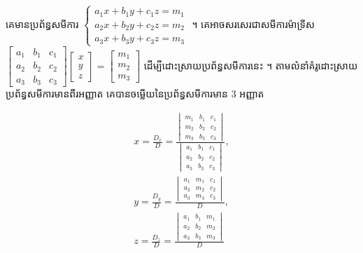 \begin{example}[ឧទាហរណ៍ ២]
គេមានប្រព័ន្ធសមីការ $\begin{cases} a_1x + b_1y + c_1z = m_1\\ a_2x + b_2y + c_2z = m_2\\ a_3x + b_3y + c_3z = m_3 \end{cases}$ ។ គេអាចសរសេរជាសមីការម៉ាទ្រីស $\begin{bmatrix} a_1 & b_1 & c_1\\ a_2 & b_2 & c_2\\ a_3 & b_3 & c_3 \end{bmatrix}\begin{bmatrix} x\\ y\\ z \end{bmatrix} = \begin{bmatrix} m_1\\ m_2\\ m_3 \end{bmatrix}$ ដើម្បីដោះស្រាយប្រព័ន្ធសមីការនេះ ។ តាមលំនាំគំរូដោះស្រាយប្រព័ន្ធសមីការមានពីរអញ្ញាត គេបានចម្លើយនៃប្រព័ន្ធសមីការមាន $3$ អញ្ញាត
\end{example}
\begin{formulaBox}[រូបមន្តក្រាម័រ (៣ អញ្ញាត)]
\[
\begin{gathered}
x = \frac{D_x}{D} = \frac{\begin{vmatrix} m_1 & b_1 & c_1\\ m_2 & b_2 & c_2\\ m_3 & b_3 & c_3 \end{vmatrix}}{\begin{vmatrix} a_1 & b_1 & c_1\\ a_2 & b_2 & c_2\\ a_3 & b_3 & c_3 \end{vmatrix}},\\
y = \frac{D_y}{D} = \frac{\begin{vmatrix} a_1 & m_1 & c_1\\ a_2 & m_2 & c_2\\ a_3 & m_3 & c_3 \end{vmatrix}}{D},\\
z = \frac{D_z}{D} = \frac{\begin{vmatrix} a_1 & b_1 & m_1\\ a_2 & b_2 & m_2\\ a_3 & b_3 & m_3 \end{vmatrix}}{D}
\end{gathered}
\]
\end{formulaBox}


